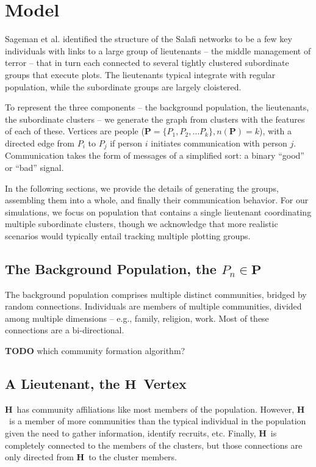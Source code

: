 \documentclass{article}
\newcommand{\Hub}[0]{\ensuremath{\mathbf{H}}}
\begin{document}
\section*{Model}
Sageman et al. identified the structure of the Salafi networks to be a few key individuals with links to a large group of lieutenants -- the middle management of terror -- that in turn each connected to several tightly clustered subordinate groups that execute plots.  The lieutenants typical integrate with regular population, while the subordinate groups are largely cloistered.

To represent the three components -- the background population, the lieutenants, the subordinate clusters -- we generate the graph from clusters with the features of each of these.  Vertices are people ($\mathbf{P}=\{P_1, P_2, \ldots P_k\}, n(\mathbf{P})=k$), with a directed edge from $P_i$ to $P_j$ if person $i$ initiates communication with person $j$.  Communication takes the form of messages of a simplified sort: a binary ``good'' or ``bad'' signal.

In the following sections, we provide the details of generating the groups, assembling them into a whole, and finally their communication behavior.  For our simulations, we focus on population that contains a single lieutenant coordinating multiple subordinate clusters, though we acknowledge that more realistic scenarios would typically entail tracking multiple plotting groups.

\subsection*{The Background Population, the $P_{n}\in\mathbf{P}$}
The background population comprises multiple distinct communities, bridged by random connections.  Individuals are members of multiple communities, divided among multiple dimensions -- e.g., family, religion, work.  Most of these connections are a bi-directional.

{\bf TODO} which community formation algorithm?

\subsection*{A Lieutenant, the \Hub\ Vertex}
\Hub\ has community affiliations like most members of the population.  However, \Hub\ is a member of more communities than the typical individual in the population given the need to gather information, identify recruits, etc.  Finally, \Hub\ is completely connected to the members of the clusters, but those connections are only directed from \Hub\ to the cluster members.
\end{document}

